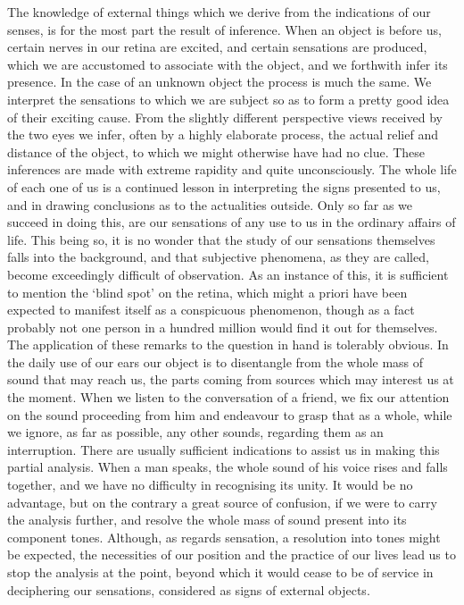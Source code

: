 The knowledge of external things which we derive from the indications of our
senses, is for the most part the result of inference. When an object is before
us, certain nerves in our retina are excited, and certain sensations are
produced, which we are accustomed to associate with the object, and we
forthwith infer its presence. In the case of an unknown object the process is
much the same. We interpret the sensations to which we are subject so as to
form a pretty good idea of their exciting cause. From the slightly different
perspective views received by the two eyes we infer, often by a highly
elaborate process, the actual relief and distance of the object, to which we
might otherwise have had no clue. These inferences are made with extreme
rapidity and quite unconsciously. The whole life of each one of us is a
continued lesson in interpreting the signs presented to us, and in drawing
conclusions as to the actualities outside. Only so far as we succeed in doing
this, are our sensations of any use to us in the ordinary affairs of life. This
being so, it is no wonder that the study of our sensations themselves falls
into the background, and that subjective phenomena, as they are called, become
exceedingly difficult of observation. As an instance of this, it is sufficient
to mention the `blind spot' on the retina, which might a priori have been
expected to manifest itself as a conspicuous phenomenon, though as a fact
probably not one person in a hundred million would find it out for themselves.
The application of these remarks to the question in hand is tolerably obvious.
In the daily use of our ears our object is to disentangle from the whole mass
of sound that may reach us, the parts coming from sources which may interest us
at the moment. When we listen to the conversation of a friend, we fix our
attention on the sound proceeding from him and endeavour to grasp that as a
whole, while we ignore, as far as possible, any other sounds, regarding them as
an interruption. There are usually sufficient indications to assist us in
making this partial analysis. When a man speaks, the whole sound of his voice
rises and falls together, and we have no difficulty in recognising its unity.
It would be no advantage, but on the contrary a great source of confusion, if
we were to carry the analysis further, and resolve the whole mass of sound
present into its component tones. Although, as regards sensation, a resolution
into tones might be expected, the necessities of our position and the practice
of our lives lead us to stop the analysis at the point, beyond which it would
cease to be of service in deciphering our sensations, considered as signs of
external objects.

